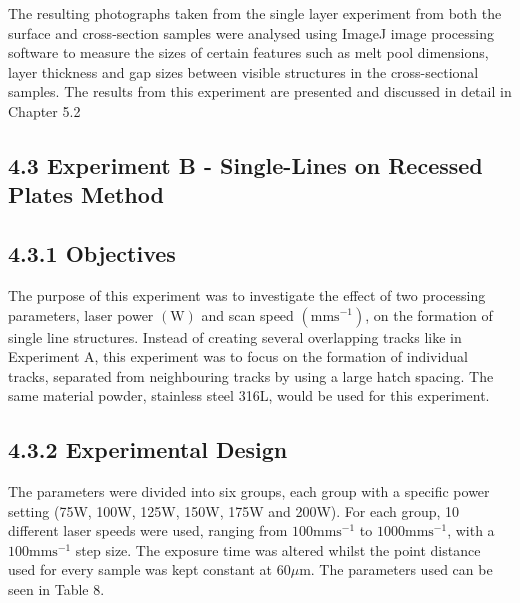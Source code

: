 \documentclass[10pt]{article}
\begin{document}
The resulting photographs taken from the single layer experiment from both the surface and cross-section samples were analysed using ImageJ image processing software to measure the sizes of certain features such as melt pool dimensions, layer thickness and gap sizes between visible structures in the cross-sectional samples. The results from this experiment are presented and discussed in detail in Chapter 5.2

\subsection*{4.3 Experiment B - Single-Lines on Recessed Plates Method}
\subsection*{4.3.1 Objectives}
The purpose of this experiment was to investigate the effect of two processing parameters, laser power $(\mathrm{W})$ and scan speed $\left(\mathrm{mms}^{-1}\right)$, on the formation of single line structures. Instead of creating several overlapping tracks like in Experiment A, this experiment was to focus on the formation of individual tracks, separated from neighbouring tracks by using a large hatch spacing. The same material powder, stainless steel 316L, would be used for this experiment.

\subsection*{4.3.2 Experimental Design}
The parameters were divided into six groups, each group with a specific power setting (75W, 100W, 125W, 150W, 175W and 200W). For each group, 10 different laser speeds were used, ranging from $100 \mathrm{mms}^{-1}$ to $1000 \mathrm{mms}^{-1}$, with a $100 \mathrm{mms}^{-1}$ step size. The exposure time was altered whilst the point distance used for every sample was kept constant at $60 \mu \mathrm{m}$. The parameters used can be seen in Table 8.
\end{document}
